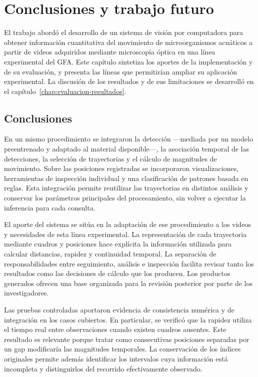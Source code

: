 \chapter{Conclusiones y trabajo futuro}
\label{chap:conclusiones}

El trabajo abordó el desarrollo de un sistema de visión por computadora para obtener información cuantitativa del movimiento de microorganismos acuáticos a partir de videos adquiridos mediante microscopía óptica en una línea experimental del GFA. Este capítulo sintetiza los aportes de la implementación y de su evaluación, y presenta las líneas que permitirían ampliar su aplicación experimental. La discusión de los resultados y de sus limitaciones se desarrolló en el capítulo~\ref{chap:evaluacion-resultados}.

\section{Conclusiones}

En un mismo procedimiento se integraron la detección ---mediada por un modelo preentrenado y adaptado al material disponible---, la asociación temporal de las detecciones, la selección de trayectorias y el cálculo de magnitudes de movimiento. Sobre las posiciones registradas se incorporaron visualizaciones, herramientas de inspección individual y una clasificación de patrones basada en reglas. Esta integración permite reutilizar las trayectorias en distintos análisis y conservar los parámetros principales del procesamiento, sin volver a ejecutar la inferencia para cada consulta.

El aporte del sistema se sitúa en la adaptación de ese procedimiento a los videos y necesidades de esta línea experimental. La representación de cada trayectoria mediante cuadros y posiciones hace explícita la información utilizada para calcular distancias, rapidez y continuidad temporal. La separación de responsabilidades entre seguimiento, análisis e inspección facilita revisar tanto los resultados como las decisiones de cálculo que los producen. Los productos generados ofrecen una base organizada para la revisión posterior por parte de los investigadores.

Las pruebas controladas aportaron evidencia de consistencia numérica y de integración en los casos cubiertos. En particular, se verificó que la rapidez utiliza el tiempo real entre observaciones cuando existen cuadros ausentes. Este resultado es relevante porque tratar como consecutivas posiciones separadas por un gap modificaría las magnitudes temporales. La conservación de los índices originales permite además identificar los intervalos cuya información está incompleta y distinguirlos del recorrido efectivamente observado.

